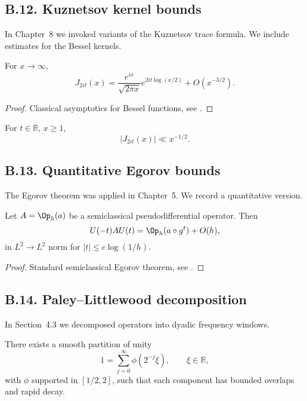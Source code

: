 \subsection*{B.12. Kuznetsov kernel bounds}

\noindent
In Chapter~8 we invoked variants of the Kuznetsov trace formula. We include
estimates for the Bessel kernels.

\begin{lemma}\label{lem:bessel}
For $x\to \infty$,
\[
J_{2it}(x) = \frac{e^{ix}}{\sqrt{2\pi x}} e^{2it\log(x/2)} + O(x^{-3/2}).
\]
\end{lemma}

\begin{proof}
Classical asymptotics for Bessel functions, see \cite[§8.451]{GradshteynRyzhik}.
\end{proof}

\begin{corollary}\label{cor:kuznetsov-kernel}
For $t\in\mathbb R$, $x\ge 1$,
\[
|J_{2it}(x)| \ll x^{-1/2}.
\]
\end{corollary}

\subsection*{B.13. Quantitative Egorov bounds}

\noindent
The Egorov theorem was applied in Chapter~5. We record a quantitative
version.

\begin{lemma}\label{lem:egorov}
Let $A=\Op_h(a)$ be a semiclassical pseudodifferential operator. Then
\[
U(-t) A U(t) = \Op_h(a\circ g^t) + O(h),
\]
in $L^2\to L^2$ norm for $|t|\le c\log(1/h)$.
\end{lemma}

\begin{proof}
Standard semiclassical Egorov theorem, see \cite{Zworski2012}.
\end{proof}

\subsection*{B.14. Paley–Littlewood decomposition}

\noindent
In Section~4.3 we decomposed operators into dyadic frequency windows.

\begin{lemma}\label{lem:paley-littlewood}
There exists a smooth partition of unity
\[
1 = \sum_{j=0}^\infty \phi(2^{-j}\xi),\qquad \xi\in\mathbb R,
\]
with $\phi$ supported in $[1/2,2]$, such that each component has bounded
overlaps and rapid decay.
\end{lemma}

